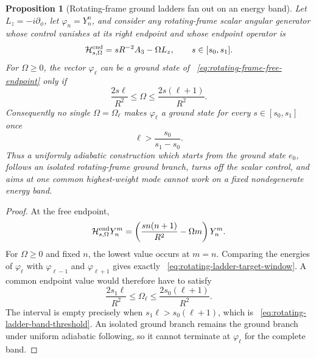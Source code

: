 \documentclass[11pt]{article}
\newtheorem{proposition}[theorem]{Proposition}
\theoremstyle{definition}
\theoremstyle{remark}
\begin{document}
\begin{proposition}[Rotating-frame ground ladders fan out on an energy band]
\label{prop:rotating-ground-ladder-fanout}
Let $L_z=-i\partial_\phi$, let
$\varphi_n=Y_n^n$, and consider any rotating-frame scalar angular generator
whose control vanishes at its right endpoint and whose endpoint operator is
\begin{equation}
 \mathcal H_{s,\Omega}^{\rm end}
 =sR^{-2}A_3-\Omega L_z,
 \qquad s\in[s_0,s_1].
 \label{eq:rotating-frame-free-endpoint}
\end{equation}
For $\Omega\geq0$, the vector $\varphi_\ell$ can be a ground state of
~\eqref{eq:rotating-frame-free-endpoint} only if
\begin{equation}
 \frac{2s\ell}{R^2}\leq\Omega
 \leq\frac{2s(\ell+1)}{R^2}.
 \label{eq:rotating-ladder-target-window}
\end{equation}
Consequently no single $\Omega=\Omega_\ell$ makes $\varphi_\ell$ a ground
state for every $s\in[s_0,s_1]$ once
\begin{equation}
 \ell>\frac{s_0}{s_1-s_0}.
 \label{eq:rotating-ladder-band-threshold}
\end{equation}
Thus a uniformly adiabatic construction which starts from the ground state
$e_0$, follows an isolated rotating-frame ground branch, turns off the scalar
control, and aims at one common highest-weight mode cannot work on a fixed
nondegenerate energy band.
\end{proposition}

\begin{proof}
At the free endpoint,
\begin{equation}
 \mathcal H_{s,\Omega}^{\rm end}Y_n^m
 =\left(\frac{s n(n+1)}{R^2}-\Omega m\right)Y_n^m.
\end{equation}
For $\Omega\geq0$ and fixed $n$, the lowest value occurs at $m=n$.  Comparing
the energies of $\varphi_\ell$ with $\varphi_{\ell-1}$ and
$\varphi_{\ell+1}$ gives exactly
~\eqref{eq:rotating-ladder-target-window}.  A common endpoint value would
therefore have to satisfy
\begin{equation}
 \frac{2s_1\ell}{R^2}\leq\Omega_\ell
 \leq\frac{2s_0(\ell+1)}{R^2}.
\end{equation}
The interval is empty precisely when
$s_1\ell>s_0(\ell+1)$, which is
~\eqref{eq:rotating-ladder-band-threshold}.  An isolated ground branch remains
the ground branch under uniform adiabatic following, so it cannot terminate at
$\varphi_\ell$ for the complete band.
\end{proof}
\end{document}
